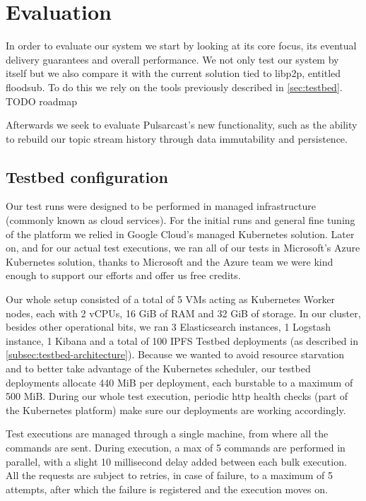 
\chapter{Evaluation}
\label{chapter:evaluation}

In order to evaluate our system we start by looking at its core focus, its
eventual delivery guarantees and overall performance. We not only test our
system by itself but we also compare it with the current solution tied to
libp2p, entitled floodsub. To do this we rely on the tools previously described
in \ref{sec:testbed}. 
TODO roadmap

Afterwards we seek to evaluate  Pulsarcast's new functionality, such as the
ability to rebuild our topic stream history through data immutability and
persistence.

\section{Testbed configuration}\label{testbed-configuration}

Our test runs were designed to be performed in managed infrastructure (commonly
known as cloud services). For the initial runs and general fine tuning of the
platform we relied in Google Cloud's managed Kubernetes solution. Later on, and
for our actual test executions, we ran all of our tests in Microsoft's Azure
Kubernetes solution, thanks to Microsoft and the Azure team we were kind enough
to support our efforts and offer us free credits.

Our whole setup consisted of a total of 5 VMs acting as Kubernetes Worker
nodes, each with 2 vCPUs, 16 GiB of RAM and 32 GiB of storage. In our cluster,
besides other operational bits, we ran 3 Elasticsearch instances, 1 Logstash
instance, 1 Kibana and a total of 100 IPFS Testbed deployments (as described in
\ref{subsec:testbed-architecture}). Because we wanted to avoid resource
starvation and to better take advantage of the Kubernetes scheduler, our
testbed deployments allocate 440 MiB per deployment, each burstable to a
maximum of 500 MiB. During our whole test execution, periodic \acrshort{http}
health checks (part of the Kubernetes platform) make sure our deployments are
working accordingly.

Test executions are managed through a single machine, from where all the
commands are sent. During execution, a max of 5 commands are performed in
parallel, with a slight 10 millisecond delay added between each bulk
execution. All the requests are subject to retries, in case of failure, to a
maximum of 5 attempts, after which the failure is registered and the execution
moves on.

